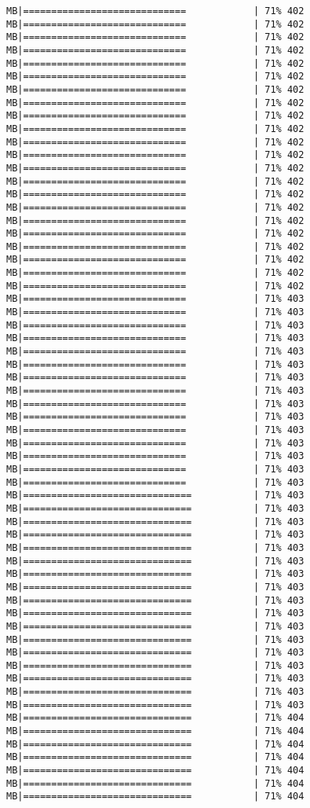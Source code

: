 \documentclass[
]{article}
\begin{document}
\begin{verbatim}
MB|=============================            | 71% 402 MB|=============================            | 71% 402 MB|=============================            | 71% 402 MB|=============================            | 71% 402 MB|=============================            | 71% 402 MB|=============================            | 71% 402 MB|=============================            | 71% 402 MB|=============================            | 71% 402 MB|=============================            | 71% 402 MB|=============================            | 71% 402 MB|=============================            | 71% 402 MB|=============================            | 71% 402 MB|=============================            | 71% 402 MB|=============================            | 71% 402 MB|=============================            | 71% 402 MB|=============================            | 71% 402 MB|=============================            | 71% 402 MB|=============================            | 71% 402 MB|=============================            | 71% 402 MB|=============================            | 71% 402 MB|=============================            | 71% 402 MB|=============================            | 71% 402 MB|=============================            | 71% 403 MB|=============================            | 71% 403 MB|=============================            | 71% 403 MB|=============================            | 71% 403 MB|=============================            | 71% 403 MB|=============================            | 71% 403 MB|=============================            | 71% 403 MB|=============================            | 71% 403 MB|=============================            | 71% 403 MB|=============================            | 71% 403 MB|=============================            | 71% 403 MB|=============================            | 71% 403 MB|=============================            | 71% 403 MB|=============================            | 71% 403 MB|=============================            | 71% 403 MB|==============================           | 71% 403 MB|==============================           | 71% 403 MB|==============================           | 71% 403 MB|==============================           | 71% 403 MB|==============================           | 71% 403 MB|==============================           | 71% 403 MB|==============================           | 71% 403 MB|==============================           | 71% 403 MB|==============================           | 71% 403 MB|==============================           | 71% 403 MB|==============================           | 71% 403 MB|==============================           | 71% 403 MB|==============================           | 71% 403 MB|==============================           | 71% 403 MB|==============================           | 71% 403 MB|==============================           | 71% 403 MB|==============================           | 71% 403 MB|==============================           | 71% 404 MB|==============================           | 71% 404 MB|==============================           | 71% 404 MB|==============================           | 71% 404 MB|==============================           | 71% 404 MB|==============================           | 71% 404 MB|==============================           | 71% 404 
\end{verbatim}
\end{document}
